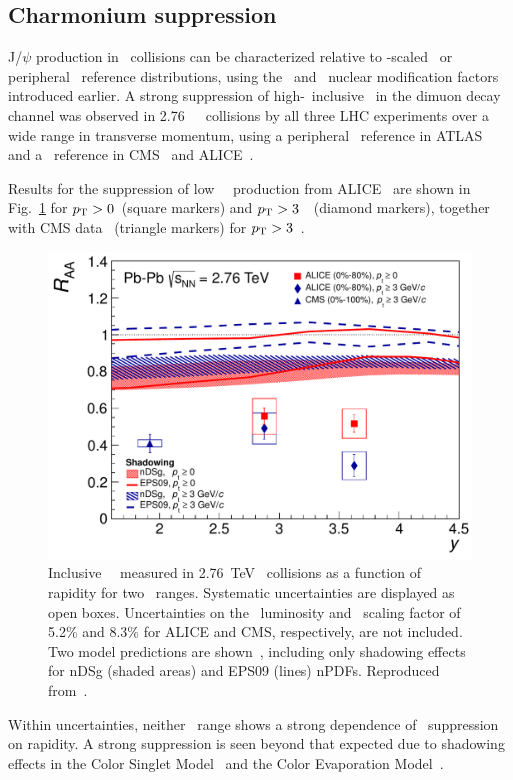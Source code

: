 \subsection{Charmonium suppression}

J/$\psi$ production in \PbPb\ collisions can be characterized relative to \Ncoll-scaled \pp\ or
peripheral \PbPb\ reference
distributions, using the \Raa\ and \Rcp\ nuclear modification factors introduced earlier.
A strong suppression of high-\pT\ inclusive \jpsi\ in the dimuon decay channel
was observed in 2.76~\TeV\  \PbPb\ collisions by all three LHC experiments over a wide
range in transverse momentum, using a peripheral \PbPb\ reference in ATLAS~\cite{Aad:2010aa}
and a \pp\ reference in CMS~\cite{Chatrchyan:2012np} and ALICE~\cite{Abelev:2012rv}.

Results for the suppression of low \pT\ \jpsi\ production from ALICE~\cite{Abelev:2012rv} are shown
in Fig.~\ref{fig:GR:raavsy} for $\mbox{$p_{\mathrm{T}}$} > 0$\GeVc\ (square markers) and
$\mbox{$p_{\mathrm{T}}$} > 3$~\GeVc\ (diamond markers), together with CMS data~\cite{Chatrchyan:2012np} (triangle markers)
for $\mbox{$p_{\mathrm{T}}$} > 3$~\GeVc.

\begin{figure}
\begin{center}
\includegraphics[width=0.49\linewidth]{qqbarfigures/RAAvsY_v7-eps-converted-to.pdf}
\caption{ \label{fig:GR:raavsy}  Inclusive \jpsi\ \Raa\ measured in 2.76~TeV \PbPb\
collisions as a function of  rapidity for two \pT\ ranges.
Systematic uncertainties are displayed as open boxes.
Uncertainties on the \pp\ luminosity and \Taa\ scaling factor of
5.2\% and  8.3\% for ALICE and CMS, respectively, are not included.
Two model predictions are shown~\cite{Ferreiro:2011rw,Vogt:2010aa}, including only shadowing effects
for  nDSg (shaded areas) and EPS09 (lines) nPDFs. Reproduced from~\cite{Abelev:2012rv}.}
\end{center}
\end{figure}

Within uncertainties, neither \pT\ range shows a strong dependence of \jpsi\ suppression on rapidity.
A strong suppression is seen beyond that expected due to shadowing effects in the Color Singlet
Model~\cite{Ferreiro:2011rw} and the Color Evaporation Model~\cite{Vogt:2010aa}.

